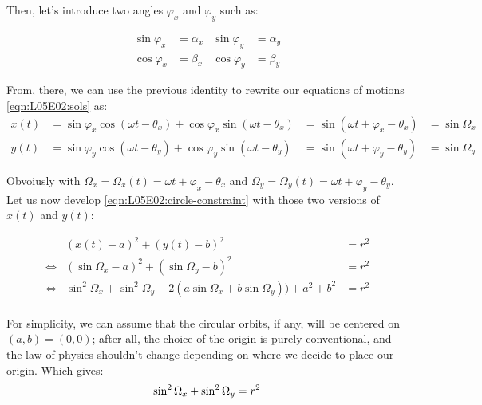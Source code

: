 \documentclass[solutions.tex]{subfiles}
\begin{document}
Then, let's introduce two angles $\varphi_x$ and $\varphi_y$ such as:

\begin{equation*} \begin{aligned}
	\sin\varphi_x &= \alpha_x & \sin\varphi_y &= \alpha_y \\
	\cos\varphi_x &= \beta_x  & \cos\varphi_y &= \beta_y
\end{aligned} \end{equation*}

From, there, we can use the previous identity to rewrite our equations of
motions \eqref{eqn:L05E02:sols} as:
\begin{equation} \label{eqn:L0502:sols-simpl} \begin{aligned}
	x(t) &= \sin\varphi_x\cos(\omega t-\theta_x)+\cos\varphi_x\sin(\omega t-\theta_x)
	&= \sin(\omega t + \varphi_x - \theta_x) &= \sin\Omega_x \\
	y(t) &= \sin\varphi_y\cos(\omega t-\theta_y)+\cos\varphi_y\sin(\omega t-\theta_y)
	&= \sin(\omega t + \varphi_y -\theta_y) &= \sin\Omega_y
\end{aligned} \end{equation}

Obvoiusly with $\Omega_x = \Omega_x(t) = \omega t + \varphi_x - \theta_x$
and $\Omega_y = \Omega_y(t) = \omega t + \varphi_y -\theta_y$. \\

Let us now develop \eqref{eqn:L05E02:circle-constraint} with those two
versions of $x(t)$ and $y(t)$:

\begin{equation*} \begin{aligned}
	~ & (x(t)-a)^2+(y(t)-b)^2 &= r^2 \\
	\Leftrightarrow & (\sin\Omega_x - a)^2
	+(\sin\Omega_y-b)^2 &= r^2 \\
	\Leftrightarrow & \sin^2\Omega_x+\sin^2\Omega_y -2(a\sin\Omega_x+b\sin\Omega_y))+a^2+b^2 &= r^2 \\
\end{aligned} \end{equation*}

For simplicity, we can assume that the circular orbits, if any, will be centered
on $(a,b)=(0,0)$; after all, the choice of the origin is purely conventional,
and the law of physics shouldn't change depending on where we decide to place
our origin. Which gives:
\[
	\sin^2\Omega_x+\sin^2\Omega_y = r^2 \\
\]
\end{document}

